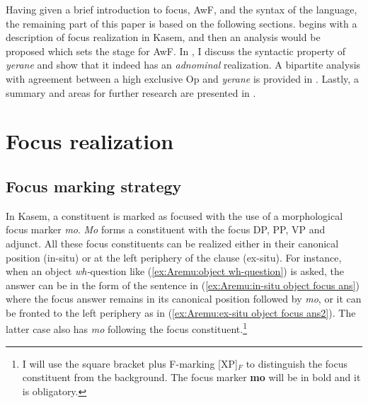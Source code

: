 \documentclass[output=paper,colorlinks,citecolor=brown,draftmode
]{langscibook}
\begin{document}
Having given a brief introduction to focus, AwF, and the syntax of the language, the remaining part of this paper is based on the following sections.  begins with a description of focus realization in Kasem, and then an analysis would be proposed which sets the stage for AwF. In , I discuss the syntactic property of \textit{yerane} and show that it indeed has an \textit{adnominal} realization. A bipartite analysis with agreement between a high exclusive Op and \textit{yerane} is provided in . Lastly, a summary and areas for further research are presented in .

\section{Focus realization} \label{sec:Aremu:FocusRealization}
\largerpage

\subsection{Focus marking strategy}
In Kasem, a constituent is marked as focused with the use of a morphological focus marker \textit{mo}. \textit{Mo} forms a constituent with the focus DP, PP, VP and adjunct. All these focus constituents can be realized either in their canonical position (in-situ) or at the left periphery of the clause (ex-situ). For instance, when an object \textit{wh-}question like (\ref{ex:Aremu:object wh-question}) is asked, the answer can be in the form of the sentence in (\ref{ex:Aremu:in-situ object focus ans}) where the focus answer remains in its canonical position followed by \textit{mo}, or it can be fronted to the left periphery as in (\ref{ex:Aremu:ex-situ object focus ans2}). The latter case also has \textit{mo} following the focus constituent.\footnote{I will use the square bracket plus F-marking [XP]$_F$ to distinguish the focus constituent from the background. The focus marker \textbf{mo} will be in bold and it is obligatory.}
\end{document}

